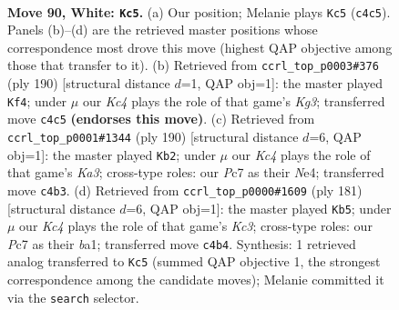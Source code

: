 \documentclass[11pt]{article}
\begin{document}
\clearpage

\begin{figure}[p]\centering
\begin{subfigure}{0.46\textwidth}\centering
\resizebox{\linewidth}{!}{%
\newchessgame
\chessboard[
  setfen={6k1/2P5/8/4B3/2K5/8/8/8 w - - 5 90},
  showmover=false,
  pgfstyle=straightmove, color=movearrow, markmove={c4-c5}
]}
\caption{}
\end{subfigure}\hfill
\begin{subfigure}{0.46\textwidth}\centering
\resizebox{\linewidth}{!}{%
\newchessgame
\chessboard[
  setfen={7k/8/6P1/8/8/3B2K1/8/8 w - - 1 96},
  showmover=false,
  pgfstyle=straightmove, color=movearrow, markmove={g3-f4}
]}
\caption{}
\end{subfigure}
\\[4pt]
\begin{subfigure}{0.46\textwidth}\centering
\resizebox{\linewidth}{!}{%
\newchessgame
\chessboard[
  setfen={8/8/8/8/4N3/K2B4/8/3k4 w - - 18 96},
  showmover=false,
  pgfstyle=straightmove, color=movearrow, markmove={a3-b2}
]}
\caption{}
\end{subfigure}\hfill
\begin{subfigure}{0.46\textwidth}\centering
\resizebox{\linewidth}{!}{%
\newchessgame
\chessboard[
  setfen={8/8/2k3b1/8/8/8/8/B1K5 b - - 3 91},
  showmover=false,
  pgfstyle=straightmove, color=movearrow, markmove={c6-b5}
]}
\caption{}
\end{subfigure}
\caption{\textbf{Move 90, White: \texttt{Kc5}.} (a) Our position; Melanie plays \texttt{Kc5} (\texttt{c4c5}). Panels (b)--(d) are the retrieved master positions whose correspondence most drove this move (highest QAP objective among those that transfer to it). (b) Retrieved from \texttt{ccrl\_top\_p0003\#376} (ply 190) [structural distance $d$=1, QAP obj=1]: the master played \texttt{Kf4}; under $\mu$ our \emph{Kc4} plays the role of that game's \emph{Kg3}; transferred move \texttt{c4c5} \textbf{(endorses this move)}. (c) Retrieved from \texttt{ccrl\_top\_p0001\#1344} (ply 190) [structural distance $d$=6, QAP obj=1]: the master played \texttt{Kb2}; under $\mu$ our \emph{Kc4} plays the role of that game's \emph{Ka3}; cross-type roles: our \emph{P}c7 as their \emph{N}e4; transferred move \texttt{c4b3}. (d) Retrieved from \texttt{ccrl\_top\_p0000\#1609} (ply 181) [structural distance $d$=6, QAP obj=1]: the master played \texttt{Kb5}; under $\mu$ our \emph{Kc4} plays the role of that game's \emph{Kc3}; cross-type roles: our \emph{P}c7 as their \emph{b}a1; transferred move \texttt{c4b4}. Synthesis: 1 retrieved analog transferred to \texttt{Kc5} (summed QAP objective 1, the strongest correspondence among the candidate moves); Melanie committed it via the \texttt{search} selector.}
\label{fig:thought-m178}
\end{figure}
\end{document}
